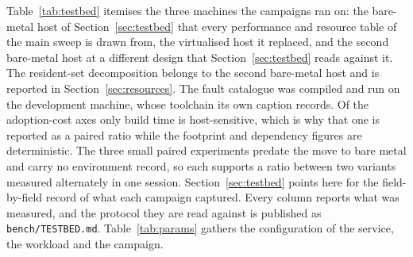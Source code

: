 \documentclass[english,oneside,a4paper,censored,csm,software-track-2020]{HYthesisML}
\begin{document}
\begin{appendices}
Table~\ref{tab:testbed} itemises the three machines the campaigns ran on: the bare-metal host of
Section~\ref{sec:testbed} that every performance and resource table of the main sweep is drawn from,
the virtualised host it replaced, and the second bare-metal host at a different design that
Section~\ref{sec:testbed} reads against it. The resident-set decomposition belongs to the
second bare-metal host and is reported in Section~\ref{sec:resources}. The fault catalogue was
compiled and run on the development machine, whose toolchain its own caption records. Of the
adoption-cost axes only build time is host-sensitive, which is why that one is reported as a
paired ratio while the footprint and dependency figures are deterministic. The three small paired
experiments predate the move to bare metal and carry no environment record, so each supports a
ratio between two variants measured alternately in one session. Section~\ref{sec:testbed} points
here for the field-by-field record of what each campaign captured. Every column reports what was
measured, and the protocol they are read against is published as \texttt{bench/TESTBED.md}.
Table~\ref{tab:params} gathers the configuration of the service, the workload and the campaign.


\end{appendices}
\end{document}
